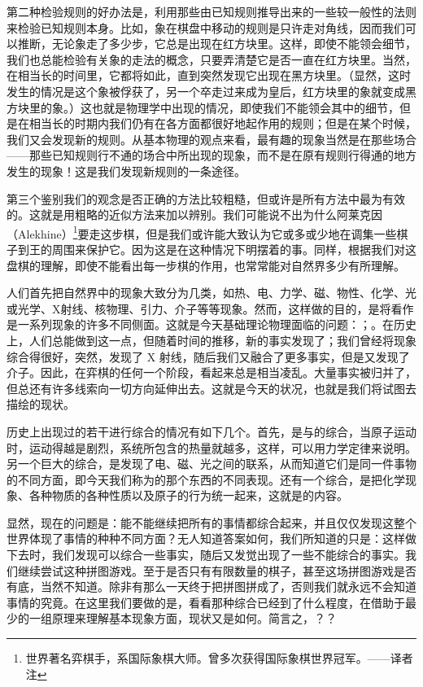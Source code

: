 \documentclass[11pt,oneside]{book}
\begin{document}
\begin{common-format}
第二种检验规则的好办法是，利用那些由已知规则推导出来的一些较一般性的法则来检验已知规则本身。比如，象在棋盘中移动的规则是只许走对角线，因而我们可以推断，无论象走了多少步，它总是出现在红方块里。这样，即使不能领会细节，我们也总能检验有关象的走法的概念，只要弄清楚它是否一直在红方块里。当然，在相当长的时间里，它都将如此，直到突然发现它出现在黑方块里。（显然，这时发生的情况是这个象被俘获了，另一个卒走过来成为皇后，红方块里的象就变成黑方块里的象。）这也就是物理学中出现的情况，即使我们不能领会其中的细节，但是在相当长的时期内我们仍有在各方面都很好地起作用的规则；但是在某个时候，我们又会发现新的规则。从基本物理的观点来看，最有趣的现象当然是在那些场合——那些已知规则行不通的场合中所出现的现象，而不是在原有规则行得通的地方发生的现象！这是我们发现新规则的一条途径。

第三个鉴别我们的观念是否正确的方法比较粗糙，但或许是所有方法中最为有效的。这就是用粗略的近似方法来加以辨别。我们可能说不出为什么阿莱克因（Alekhine）\footnote{世界著名弈棋手，系国际象棋大师。曾多次获得国际象棋世界冠军。——译者注}要走这步棋，但是我们或许能大致认为它或多或少地在调集一些棋子到王的周围来保护它。因为这是在这种情况下明摆着的事。同样，根据我们对这盘棋的理解，即使不能看出每一步棋的作用，也常常能对自然界多少有所理解。

人们首先把自然界中的现象大致分为几类，如热、电、力学、磁、物性、化学、光或光学、X射线、核物理、引力、介子等等现象。然而，这样做的目的，是将看作是一系列现象的许多不同侧面。这就是今天基础理论物理面临的问题：；。在历史上，人们总能做到这一点，但随着时间的推移，新的事实发现了；我们曾经将现象综合得很好，突然，发现了 X 射线，随后我们又融合了更多事实，但是又发现了介子。因此，在弈棋的任何一个阶段，看起来总是相当凌乱。大量事实被归并了，但总还有许多线索向一切方向延伸出去。这就是今天的状况，也就是我们将试图去描绘的现状。

历史上出现过的若干进行综合的情况有如下几个。首先，是与的综合，当原子运动时，运动得越是剧烈，系统所包含的热量就越多，这样，可以用力学定律来说明。另一个巨大的综合，是发现了电、磁、光之间的联系，从而知道它们是同一件事物的不同方面，即今天我们称为的那个东西的不同表现。还有一个综合，是把化学现象、各种物质的各种性质以及原子的行为统一起来，这就是的内容。

显然，现在的问题是：能不能继续把所有的事情都综合起来，并且仅仅发现这整个世界体现了事情的种种不同方面？无人知道答案如何，我们所知道的只是：这样做下去时，我们发现可以综合一些事实，随后又发觉出现了一些不能综合的事实。我们继续尝试这种拼图游戏。至于是否只有有限数量的棋子，甚至这场拼图游戏是否有底，当然不知道。除非有那么一天终于把拼图拼成了，否则我们就永远不会知道事情的究竟。在这里我们要做的是，看看那种综合已经到了什么程度，在借助于最少的一组原理来理解基本现象方面，现状又是如何。简言之，？？


\end{common-format}
\end{document}
